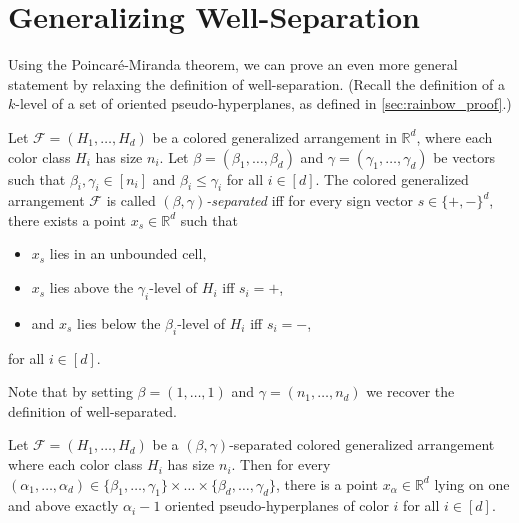 \documentclass[a4paper,UKenglish,cleveref, autoref, thm-restate, nolineno]{socg-lipics-v2021}
\begin{document}
\section{Generalizing Well-Separation}\label{sec:generalized_separation}
Using the Poincar\'{e}-Miranda theorem, we can prove an even more general statement by relaxing the definition of well-separation. (Recall the definition of a $k$-level of a set of oriented pseudo-hyperplanes, as defined in \cref{sec:rainbow_proof}.) 

\begin{definition}
\label{def:generalized_separation}
Let $\mathcal{F}=(H_1, \dots, H_d)$ be a colored generalized arrangement in $\mathbb{R}^d$, where each color class $H_i$ has size $n_i$. Let $\beta=(\beta_1,\ldots,\beta_d)$ and $\gamma=(\gamma_1,\ldots,\gamma_d)$ be vectors such that $\beta_i, \gamma_i \in [n_i]$ and $\beta_i\leq \gamma_i$ for all $i \in [d]$.
The colored generalized arrangement $\mathcal{F}$ is called \emph{$(\beta,\gamma)$-separated} iff for every sign vector $s \in \{+, -\}^d$, there exists a point $x_s \in \mathbb{R}^d$ such that 
\begin{itemize}
	\item $x_s$ lies in an unbounded cell,
    \item $x_s$ lies above the $\gamma_i$-level of $H_i$ iff $s_i = +$,
    \item and $x_s$ lies below the $\beta_i$-level of $H_i$ iff $s_i = -$,
\end{itemize}
for all $i \in [d]$.
\end{definition}

Note that by setting $\beta=(1,\ldots, 1)$ and $\gamma=(n_1,\ldots,n_d)$ we recover the definition of well-separated.

\begin{theorem}
\label{thm:beta-gamma}
Let $\mathcal{F}=(H_1, \ldots,H_d)$ be a $(\beta,\gamma)$-separated colored generalized arrangement where each color class $H_i$ has size $n_i$. Then for every $(\alpha_1, \dots, \alpha_d) \in \{\beta_1,\ldots,\gamma_1\} \times \dots \times \{\beta_d,\ldots,\gamma_d\}$, there is a point $x_{\alpha} \in \mathbb{R}^d$ lying on one and above exactly $\alpha_i - 1$ oriented pseudo-hyperplanes of color $i$ for all $i \in [d]$.
\end{theorem}
\end{document}
